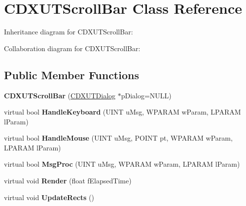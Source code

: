 \hypertarget{class_c_d_x_u_t_scroll_bar}{\section{C\+D\+X\+U\+T\+Scroll\+Bar Class Reference}
\label{class_c_d_x_u_t_scroll_bar}
}


Inheritance diagram for C\+D\+X\+U\+T\+Scroll\+Bar\+:


Collaboration diagram for C\+D\+X\+U\+T\+Scroll\+Bar\+:
\subsection*{Public Member Functions}
\begin{DoxyCompactItemize}
\item 
\hypertarget{class_c_d_x_u_t_scroll_bar_accc3179c9b36ece4b5560bb1310689e7}{{\bfseries C\+D\+X\+U\+T\+Scroll\+Bar} (\hyperlink{class_c_d_x_u_t_dialog}{C\+D\+X\+U\+T\+Dialog} $\ast$p\+Dialog=N\+U\+L\+L)}\label{class_c_d_x_u_t_scroll_bar_accc3179c9b36ece4b5560bb1310689e7}

\item 
\hypertarget{class_c_d_x_u_t_scroll_bar_a07c561820f6f3362f94a391c7ff58b04}{virtual bool {\bfseries Handle\+Keyboard} (U\+I\+N\+T u\+Msg, W\+P\+A\+R\+A\+M w\+Param, L\+P\+A\+R\+A\+M l\+Param)}\label{class_c_d_x_u_t_scroll_bar_a07c561820f6f3362f94a391c7ff58b04}

\item 
\hypertarget{class_c_d_x_u_t_scroll_bar_aa0c2286530836c1ed431dea5760280da}{virtual bool {\bfseries Handle\+Mouse} (U\+I\+N\+T u\+Msg, P\+O\+I\+N\+T pt, W\+P\+A\+R\+A\+M w\+Param, L\+P\+A\+R\+A\+M l\+Param)}\label{class_c_d_x_u_t_scroll_bar_aa0c2286530836c1ed431dea5760280da}

\item 
\hypertarget{class_c_d_x_u_t_scroll_bar_a8c4363b3a1415d06e22906e706e1ff76}{virtual bool {\bfseries Msg\+Proc} (U\+I\+N\+T u\+Msg, W\+P\+A\+R\+A\+M w\+Param, L\+P\+A\+R\+A\+M l\+Param)}\label{class_c_d_x_u_t_scroll_bar_a8c4363b3a1415d06e22906e706e1ff76}

\item 
\hypertarget{class_c_d_x_u_t_scroll_bar_af6d6b6cb10b97977b2d3a2172d4059ac}{virtual void {\bfseries Render} (float f\+Elapsed\+Time)}\label{class_c_d_x_u_t_scroll_bar_af6d6b6cb10b97977b2d3a2172d4059ac}

\item 
\hypertarget{class_c_d_x_u_t_scroll_bar_ae25e1547d974b0913688da998e43d331}{virtual void {\bfseries Update\+Rects} ()}\label{class_c_d_x_u_t_scroll_bar_ae25e1547d974b0913688da998e43d331}


\end{DoxyCompactItemize}
